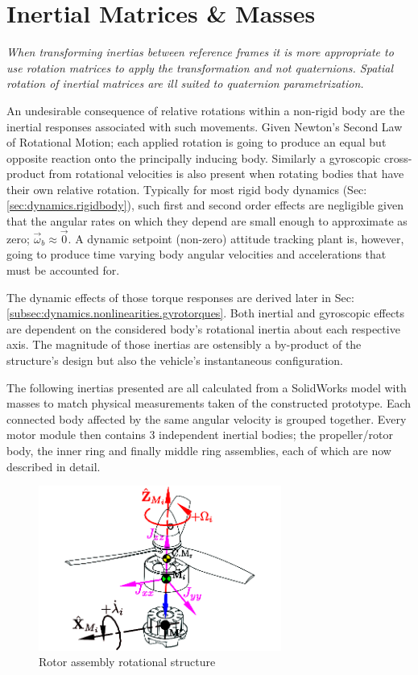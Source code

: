 \section{Inertial Matrices \& Masses}
\label{sec:proto.inertia}
\emph{\color{Gray}When transforming inertias between reference frames it is more appropriate to use rotation matrices to apply the transformation and not quaternions. Spatial rotation of inertial matrices are ill suited to quaternion parametrization.}
\par
An undesirable consequence of relative rotations within a non-rigid body are the inertial responses associated with such movements. Given Newton's Second Law of Rotational Motion; each applied rotation is going to produce an equal but opposite reaction onto the principally inducing body. Similarly a gyroscopic cross-product from rotational velocities is also present when rotating bodies that have their own relative rotation. Typically for most rigid body dynamics (Sec:\ref{sec:dynamics.rigidbody}), such first and second order effects are negligible given that the angular rates on which they depend are small enough to approximate as zero; $\vec{\omega}_b\approx\vec{0}$. A dynamic setpoint (non-zero) attitude tracking plant is, however, going to produce time varying body angular velocities and accelerations that must be accounted for.
\par
The dynamic effects of those torque responses are derived later in Sec:\ref{subsec:dynamics.nonlinearities.gyrotorques}. Both inertial and gyroscopic effects are dependent on the considered body's rotational inertia about each respective axis. The magnitude of those inertias are ostensibly a by-product of the structure's design but also the vehicle's instantaneous configuration.
\par
The following inertias presented are all calculated from a SolidWorks model with masses to match physical measurements taken of the constructed prototype. Each connected body affected by the same angular velocity is grouped together. Every motor module then contains 3 independent inertial bodies; the propeller/rotor body, the inner ring and finally middle ring assemblies, each of which are now described in detail. 
\begin{figure}[hbtp]
\vspace{-6pt}
\centering
\includegraphics[width=0.71\textwidth]{figs/inertia-prop}
\caption{Rotor assembly rotational structure}
\label{fig:inertia-prop}
\vspace{-14pt}
\end{figure}
